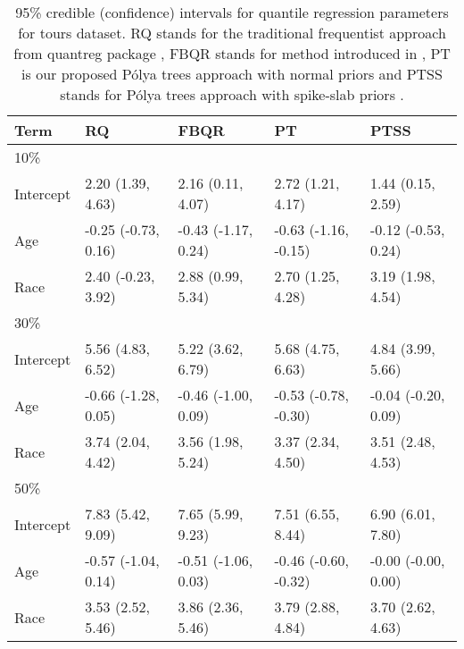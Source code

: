 \documentclass[12pt]{article}
\newcommand{\polya}{P\'{o}lya}
\begin{document}
\begin{table}[h]
  \caption[]{\label{tab:tours} 95\% credible (confidence) intervals for
    quantile regression parameters for tours dataset. RQ stands for the
    traditional frequentist approach from quantreg package \citep{quantreg}, FBQR stands for method introduced in \cite{reich2010},
    PT is our proposed \polya{} trees approach with normal priors and PTSS stands for
    \polya{} trees approach with spike-slab priors .}
  \vspace{4mm}

  \centering
  \begin{tabular}[tb]{l|l|l|l|l}
    \toprule
    Term  & RQ                   & FBQR                 & PT                   & PTSS                 \\
    \hline
    10\%  &                      &                      &                      &                      \\
    Intercept & 2.20 (1.39, 4.63)    & 2.16 (0.11, 4.07)    & 2.72 (1.21, 4.17)    & 1.44 (0.15, 2.59)    \\
    Age       & -0.25 (-0.73, 0.16)  & -0.43 (-1.17, 0.24)  & -0.63 (-1.16, -0.15) & -0.12 (-0.53, 0.24)  \\
    Race      & 2.40 (-0.23, 3.92)   & 2.88 (0.99, 5.34)    & 2.70 (1.25, 4.28)    & 3.19 (1.98, 4.54)    \\
    \hline
    30\%      &                      &                      &                      &                      \\
    Intercept & 5.56 (4.83, 6.52)    & 5.22 (3.62, 6.79)    & 5.68 (4.75, 6.63)    & 4.84 (3.99, 5.66)    \\
    Age       & -0.66 (-1.28, 0.05)  & -0.46 (-1.00, 0.09)  & -0.53 (-0.78, -0.30) & -0.04 (-0.20, 0.09)  \\
    Race      & 3.74 (2.04, 4.42)    & 3.56 (1.98, 5.24)    & 3.37 (2.34, 4.50)    & 3.51 (2.48, 4.53)    \\
    \hline
    50\%      &                      &                      &                      &                      \\
    Intercept & 7.83 (5.42, 9.09)    & 7.65 (5.99, 9.23)    & 7.51 (6.55, 8.44)    & 6.90 (6.01, 7.80)    \\
    Age       & -0.57 (-1.04, 0.14)  & -0.51 (-1.06, 0.03)  & -0.46 (-0.60, -0.32) & -0.00 (-0.00, 0.00)  \\
    Race      & 3.53 (2.52, 5.46)    & 3.86 (2.36, 5.46)    & 3.79 (2.88, 4.84)    & 3.70 (2.62, 4.63)    \\

\end{tabular}
\end{table}
\end{document}
